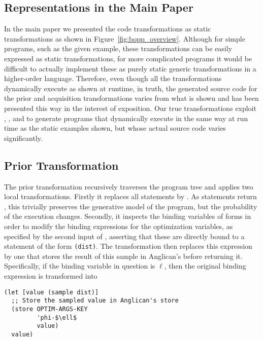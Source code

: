 \subsection{Representations in the Main Paper}
\label{sec:bopp-supp/main-paper-rep}

In the main paper we presented the code transformations as static transformations as shown in Figure~\ref{fig:bopp_overview}.  Although for simple programs, such as the given example, these transformations can be easily expressed as static transformations, for more complicated programs it would be difficult to actually implement these as purely static generic transformations in a higher-order language.  Therefore, even though all the transformations dynamically execute as shown at runtime, in truth, the generated source code for the prior and acquisition transformations varies from what is shown and has been presented this way in the interest of exposition.  Our true transformations exploit , ,  and  to generate programs that dynamically execute in the same way at run time as the static examples shown, but whose actual source code varies significantly.

\subsection{Prior Transformation}
\label{sec:bopp-supp/prior-transformations}
The prior transformation recursively traverses the program tree and applies two local transformations.  
Firstly it replaces all \observe statements by .  
As \observe statements return , this trivially preserves the generative model of the program, but the probability of the execution changes. 
Secondly, it inspects the binding variables of  forms in order to modify the binding expressions for the optimization variables, as specified by the second input of , asserting that these are directly bound to a \sample statement of the form \texttt{(\sample dist)}.
The transformation then replaces this expression by one that stores the result of this sample in Anglican's  before returning it.
Specifically, if the binding variable in question is $\ell$, then the original binding expression  is transformed into
    \begin{lstlisting}[basicstyle=\footnotesize\ttfamily]
(let [value (sample dist)]
  ;; Store the sampled value in Anglican's store
  (store OPTIM-ARGS-KEY
         'phi-$\ell$
         value)
  value)
    \end{lstlisting}

